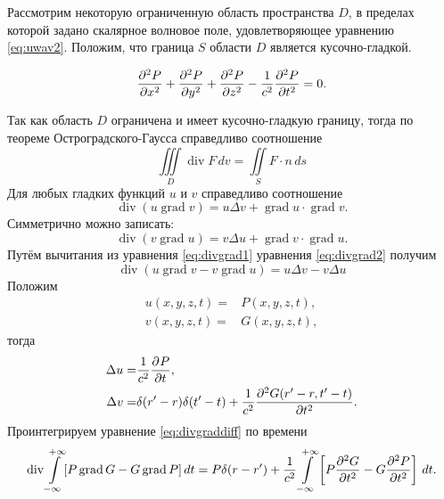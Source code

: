\documentclass[a4paper, fontsize=14pt]{article}
\newcommand{\divop}{\operatorname{div}}
\newcommand{\gradop}{\operatorname{grad}}
\begin{document}
	Рассмотрим  некоторую ограниченную область пространства $D$, в пределах которой задано скалярное волновое поле, удовлетворяющее уравнению \ref{eq:uwav2}. Положим, что граница $S$ области $D$ является кусочно-гладкой.
	
	\begin{equation}
		\diff[2]{P}{x}  + \diff[2]{P}{y} +
		\diff[2]{P}{z}  - \frac{1}{c^2} \frac{\partial^2 P}{\partial
			t^2} = 0.
		\label{eq:uwav2}
	\end{equation}
	
	Так как область $D$ ограничена и имеет кусочно-гладкую границу, тогда по
	теореме Остроградского-Гаусса справедливо соотношение
	\begin{equation}
		\iiint\limits_D \divop F \, dv = \iint\limits_S F \cdot n \, ds 
		\label{eq:vgauss}
	\end{equation}
	Для любых гладких функций $u$ и $v$ справедливо соотношение 
	\begin{equation}
		\divop (u \gradop v) = u\Delta v + \gradop u \cdot \gradop v.
		\label{eq:divgrad1}
	\end{equation}
	Симметрично можно записать:
	\begin{equation}
		\divop (v \gradop u) = v\Delta u + \gradop v \cdot \gradop u.
		\label{eq:divgrad2}
	\end{equation}
	Путём вычитания из уравнения \ref{eq:divgrad1} уравнения \ref{eq:divgrad2} получим 
	\begin{equation}
		\divop (u \gradop v - v \gradop u)  = u\Delta v - v \Delta u
		\label{eq:divgraddiff}
	\end{equation}
	Положим 
	\begin{eqnarray}
		u(x,y,z,t) =& P(x,y,z,t),\label{eq:subsu}\\
		v(x,y,z,t) = &G(x,y,z,t)\label{eq:subsv},
	\end{eqnarray}	
	тогда 
\begin{eqnarray}
	\Delta u =& \frac{1}{c^2} \diff[]{P}{t},\label{eq:subsdu}\\
	\Delta v = &\delta (r' - r) \delta(t' - t) + \frac{1}{c^2} \diff [2]{G(r' -r,t'-t)}{t}.\label{eq:subsdv}
\end{eqnarray}
	Проинтегрируем уравнение \ref{eq:divgraddiff} по времени
	\begin{equation}
		\divop \int\limits_{-\infty}^{+\infty} [P \gradop G - G \gradop P ]\, dt=  P\delta(r-r') +\frac{1}{c^2}\int\limits_{-\infty}^{+\infty}\left[P\diff[2]{G}{t} - G \diff[2]{P}{t}\right]\,dt.
		\label{eq:ugauss}
	\end{equation}
\end{document}
